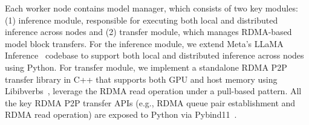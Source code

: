 
Each worker node contains model manager, which consists of two key modules: (1) inference module,  responsible for executing both local and distributed inference across nodes and (2) transfer module, which manages RDMA-based model block transfers. For the inference module, we extend Meta's LLaMA Inference~\cite{metainf} codebase to support both local and distributed inference across nodes using Python. For transfer module, we implement a standalone RDMA P2P transfer library in C++ that supports both GPU and host memory using Libibverbs~\cite{ibverbs}, leverage the RDMA read operation under a pull-based pattern. All the key RDMA P2P transfer APIs (e.g., RDMA queue pair establishment and RDMA read operation) are exposed to Python via Pybind11~\cite{pybind11}. 
\fi 





